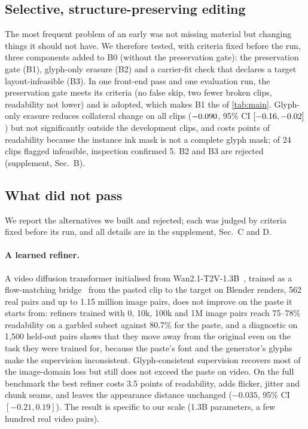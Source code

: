 \subsection{Selective, structure-preserving editing}
\label{sec:exp_sel}
The most frequent problem of an early \method was not missing material but changing things it should not have. We therefore tested, with criteria fixed before the run, three components added to B0 (\method without the preservation gate): the preservation gate (B1), glyph-only erasure (B2) and a carrier-fit check that declares a target layout-infeasible (B3). In one front-end pass and one evaluation run, the preservation gate meets its criteria (no false skip, two fewer broken clips, readability not lower) and is adopted, which makes B1 the \method of \cref{tab:main}. Glyph-only erasure reduces collateral change on all clips ($-0.090$, 95\% CI $[-0.16, -0.02]$) but not significantly outside the development clips, and costs \sBtwoCost{} points of readability because the instance ink mask is not a complete glyph mask; of 24 clips flagged infeasible, inspection confirmed 5. B2 and B3 are rejected (supplement, Sec.~B).

\subsection{What did not pass}
\label{sec:exp_neg}
We report the alternatives we built and rejected; each was judged by criteria fixed before its run, and all details are in the supplement, Sec.~C and D.

\paragraph{A learned refiner.} A video diffusion transformer initialised from Wan2.1-T2V-1.3B~\cite{wan2025wan}, trained as a flow-matching bridge~\cite{lipman2023flowmatching,liu2023rectifiedflow} from the pasted clip to the target on Blender renders, 562 real pairs and up to 1.15 million image pairs, does not improve on the paste it starts from: refiners trained with 0, 10k, 100k and 1M image pairs reach 75--78\% readability on a garbled subset against 80.7\% for the paste, and a diagnostic on 1{,}500 held-out pairs shows that they move away from the original even on the task they were trained for, because the paste's font and the generator's glyphs make the supervision inconsistent. Glyph-consistent supervision recovers most of the image-domain loss but still does not exceed the paste on video. On the full benchmark the best refiner costs 3.5 points of readability, adds flicker, jitter and chunk seams, and leaves the appearance distance unchanged ($-0.035$, 95\% CI $[-0.21, 0.19]$). The result is specific to our scale (1.3B parameters, a few hundred real video pairs).

